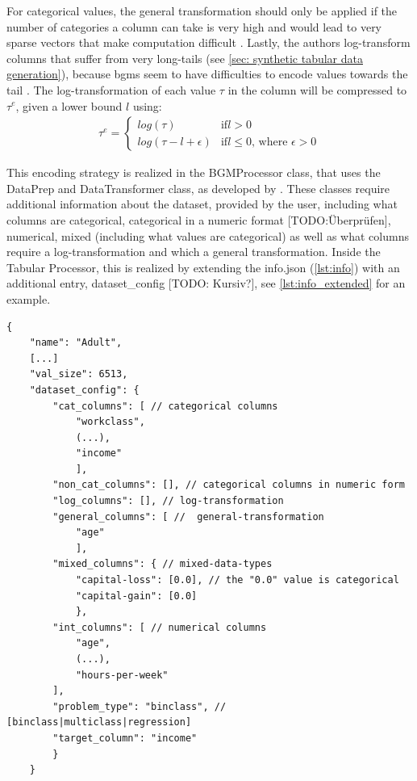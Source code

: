 For categorical values, the general transformation should only be applied if the number of categories a column can take is very high and would lead to very sparse vectors that make computation difficult \cite{zhao2022CTABGANEnhancingTabular}.
Lastly, the authors log-transform columns that suffer from very long-tails (see \autoref{sec: synthetic tabular data generation}), because \Glspl{bgm} seem to have difficulties to encode values towards the tail \cite{zhao2022CTABGANEnhancingTabular}.
The log-transformation of each value $\tau$ in the column will be compressed to $\tau^e$, given a lower bound $l$ using:
\begin{equation}
	\label{eqn:log-transform}
	\begin{align*}
		\tau^e =
		\begin{cases}
			log(\tau)            & \text{if} l>0                                 \\
			log(\tau-l+\epsilon) & \text{if} l\leq0 \text{, where } \epsilon > 0
		\end{cases}
	\end{align*}
\end{equation}

This encoding strategy is realized in the BGMProcessor class, that uses the DataPrep and DataTransformer class, as developed by \cite{zhao2022CTABGANEnhancingTabular}.
These classes require additional information about the dataset, provided by the user, including what columns are categorical, categorical in a numeric format [TODO:Überprüfen], numerical, mixed (including what values are categorical) as well as what columns require a log-transformation and which a general transformation.
Inside the Tabular Processor, this is realized by extending the info.json (\autoref{lst:info}) with an additional entry, dataset\_config [TODO: Kursiv?], see \autoref{lst:info_extended} for an example.

\begin{lstlisting}[label={lst:info_extended},caption={Example extended data info file}]
    {
    "name": "Adult",
    [...]
    "val_size": 6513,
    "dataset_config": {
        "cat_columns": [ // categorical columns
            "workclass", 
            (...), 
            "income"
            ],
        "non_cat_columns": [], // categorical columns in numeric form
        "log_columns": [], // log-transformation
        "general_columns": [ //  general-transformation
            "age"
            ], 
        "mixed_columns": { // mixed-data-types
            "capital-loss": [0.0], // the "0.0" value is categorical           
            "capital-gain": [0.0]
            },
        "int_columns": [ // numerical columns 
            "age", 
            (...), 
            "hours-per-week"
        ],
        "problem_type": "binclass", // [binclass|multiclass|regression]
        "target_column": "income"
        }
    }
\end{lstlisting}

